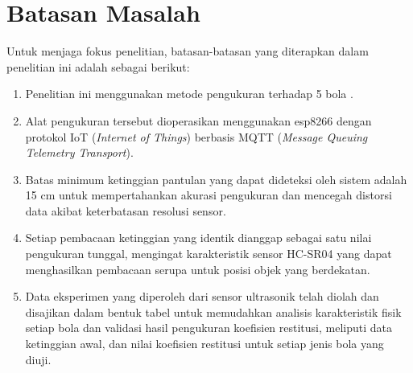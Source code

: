 \section{Batasan Masalah}
 Untuk menjaga fokus penelitian, batasan-batasan yang diterapkan dalam penelitian ini adalah sebagai berikut:
\begin{enumerate}
    \item Penelitian ini menggunakan metode pengukuran terhadap 5 bola .
    \item Alat pengukuran tersebut dioperasikan menggunakan esp8266 dengan protokol  IoT (\textit{Internet of Things}) berbasis MQTT (\textit{Message Queuing Telemetry Transport}).
    \item Batas minimum ketinggian pantulan yang dapat dideteksi oleh sistem adalah 15 cm untuk mempertahankan akurasi pengukuran dan mencegah distorsi data akibat keterbatasan resolusi sensor.
    \item Setiap pembacaan ketinggian yang identik dianggap sebagai satu nilai pengukuran tunggal, mengingat karakteristik sensor HC-SR04 yang dapat menghasilkan pembacaan serupa untuk posisi objek yang berdekatan.
    \item Data eksperimen yang diperoleh dari sensor ultrasonik telah diolah dan disajikan dalam bentuk tabel untuk memudahkan analisis karakteristik fisik setiap bola dan validasi hasil pengukuran koefisien restitusi, meliputi data ketinggian awal, dan nilai koefisien restitusi untuk setiap jenis bola yang diuji.
\end{enumerate}

